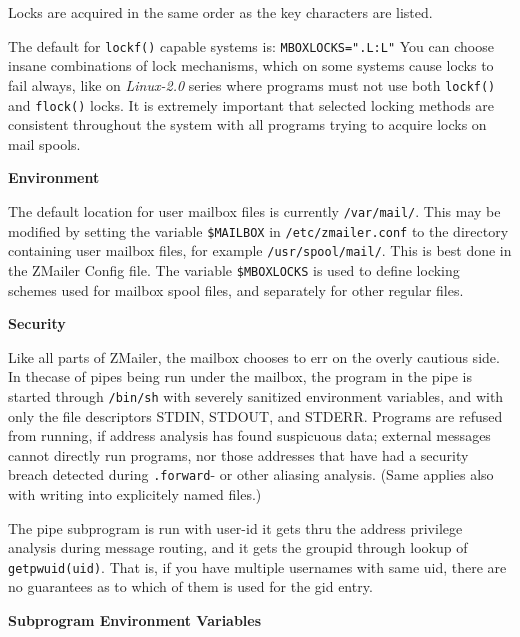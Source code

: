 Locks are acquired in the same order as the key characters are listed.

The default for {\tt lockf()} capable systems is: {\tt MBOXLOCKS=".L:L"}
You can choose insane combinations of lock mechanisms, which on
some systems cause locks to fail always, like on {\em Linux-2.0} series
where programs must not use both {\tt lockf()} and {\tt flock()} locks.
It is extremely important that selected locking methods are consistent
throughout the system with all programs trying to acquire locks on
mail spools.

{\bf Environment}

The default location for user mailbox files is 
currently {\tt /var/mail/}. This may be modified by setting the variable
{\tt \$MAILBOX} in {\tt /etc/zmailer.conf} to the directory containing 
user mailbox files, for example {\tt /usr/spool/mail/}. This is best done 
in the ZMailer Config file. The variable {\tt \$MBOXLOCKS} is used to define locking schemes used for
mailbox spool files, and separately for other regular files.

{\bf Security}

Like all parts of ZMailer, the mailbox chooses to
err on the overly cautious side.  In thecase of pipes being run under
the mailbox, the program in the pipe is started through {\tt /bin/sh} with
severely sanitized environment variables, and with only the file
descriptors STDIN, STDOUT, and STDERR. Programs are refused from
running, if address analysis has found suspicuous data; external
messages cannot directly run programs, nor those addresses that
have had a security breach detected during {\tt .forward}- or other
aliasing analysis.
(Same applies also with writing into explicitely named files.)

The pipe subprogram is run with user-id it gets thru the address
privilege analysis during message routing, and it gets the groupid 
through lookup of {\tt getpwuid(uid)}. That is, if you have multiple
usernames with same uid, there are no guarantees as to which of
them is used for the gid entry.

{\bf Subprogram Environment Variables}

